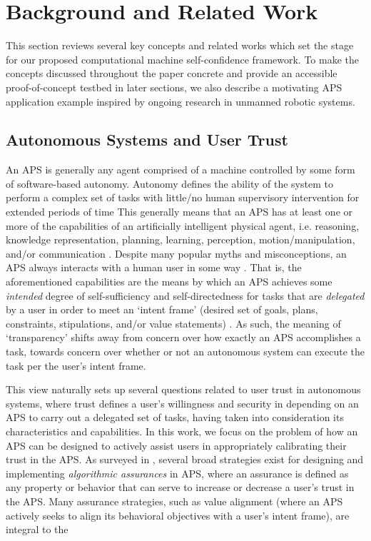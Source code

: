 \section{Background and Related Work}
This section reviews several key concepts and related works which set the stage for our proposed computational machine self-confidence framework. To make the concepts discussed throughout the paper concrete and provide an accessible proof-of-concept testbed in later sections, we also describe a motivating APS application example inspired by ongoing research in unmanned robotic systems.  

\subsection{Autonomous Systems and User Trust}
An APS is generally any agent comprised of a machine controlled by some form of software-based autonomy. Autonomy defines the ability of the system to perform a complex set of tasks with little/no human supervisory intervention for extended periods of time  This generally means that an APS has at least one or more of the capabilities of an artificially intelligent physical agent, i.e. reasoning, knowledge representation, planning, learning, perception, motion/manipulation, and/or communication \cite{Israelsen2017-ym}. 
Despite many popular myths and misconceptions, an APS always interacts with a human user in some way \cite{Bradshaw2013-ck}. 
That is, the aforementioned capabilities are the means by which an APS achieves some \emph{intended} degree of self-sufficiency and self-directedness for tasks that are \emph{delegated} by a user in order to meet an `intent frame' (desired set of goals, plans, constraints, stipulations, and/or value statements) \cite{Miller2014-av}. 
As such, the meaning of `transparency' shifts away from concern over how exactly an APS accomplishes a task, towards concern over whether or not an autonomous system can execute the task per the user's intent frame. 

This view naturally sets up several questions related to user trust in autonomous systems, where trust defines a user's willingness and security in depending on an APS to carry out a delegated set of tasks, having taken into consideration its characteristics and capabilities. 
In this work, we focus on the problem of how an APS can be designed to actively assist users in appropriately calibrating their trust in the APS. As surveyed in \cite{Israelsen2018-es} , several broad strategies exist for designing and implementing \emph{algorithmic assurances} in APS, where an assurance is defined as any property or behavior that can serve to increase or decrease a user's trust in the APS. 
Many assurance strategies, such as value alignment (where an APS actively seeks to align its behavioral objectives with a user's intent frame), are integral to the  

